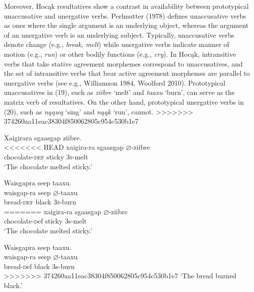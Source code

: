 \documentclass[output=paper]{LSP/langsci}
\begin{document}
\begin{exe}
\begin{exe}
\begin{exe}
Moreover, Hoc\k{a}k resultatives show a contrast in availability between prototypical unaccusative and unergative verbs. Perlmutter (1978) defines unaccusative verbs as ones where the single argument is an underlying object, whereas the argument of an unergative verb is an underlying subject. Typically, unaccusative verbs denote change (e.g., \textit{break, melt}) while unergative verbs indicate manner of motion (e.g., \textit{run}) or other bodily functions (e.g., \textit{cry}). In Hoc\k{a}k, intransitive verbs that take stative agreement morphemes correspond to unaccusatives, and the set of intransitive verbs that bear active agreement morphemes are parallel to unergative verbs (see e.g., Williamson 1984, Woolford 2010). Prototypical unaccusatives in (19), such as \textit{ziibre} `melt' and \textit{taaxu} `burn', can serve as the matrix verb of resultatives. On the other hand, prototypical unergative verbs in (20), such as \textit{n\k{a}\k{a}w\k{a}} `sing' and \textit{n\k{a}\k{a}k} `run', cannot.
>>>>>>> 374260aa11eac38304f850062805c954c530b1e7

\begin{exe}
\ex
\begin{xlist}

\ex \glll Xaigirara sgaasgap {ziibre}. \\
<<<<<<< HEAD
 xaigira-ra sgaasgap {$\varnothing$}-ziibre\\
chocolate-\textsc{def} sticky \textsc{3s}-melt\\
\glt `The chocolate melted sticky.'

\ex \glll Waisgapra seep {taaxu}.\\
 waisgap-ra seep {$\varnothing$}-taaxu\\
bread-\textsc{def} black \textsc{3s}-burn\\
=======
 xaigira-ra sgaasgap $\varnothing$-ziibre\\
chocolate-{\textsc def} sticky {\textsc 3s}-melt\\
\glt `The chocolate melted sticky.'

\ex \glll Waisgapra seep {taaxu}.\\
 waisgap-ra seep $\varnothing$-taaxu\\
bread-{\textsc def} black {\textsc 3s}-burn\\
>>>>>>> 374260aa11eac38304f850062805c954c530b1e7
\glt `The bread burned black.'

\end{xlist}
\end{exe}


\end{exe}
\end{exe}
\end{exe}
\end{document}
